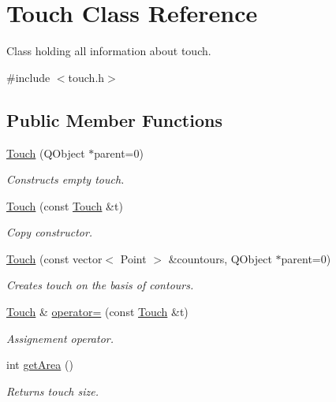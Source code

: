 \hypertarget{class_touch}{
\section{Touch Class Reference}
\label{d1/dff/class_touch}
}


Class holding all information about touch.  




{\ttfamily \#include $<$touch.h$>$}

\subsection*{Public Member Functions}
\begin{DoxyCompactItemize}
\item 
\hyperlink{class_touch_acf278e9c8973d8ded627059841c2fb69}{Touch} (QObject $\ast$parent=0)
\begin{DoxyCompactList}\small\item\em Constructs empty touch. \item\end{DoxyCompactList}\item 
\hyperlink{class_touch_ad5b4890fe1fbf210630a0789ee4c1fad}{Touch} (const \hyperlink{class_touch}{Touch} \&t)
\begin{DoxyCompactList}\small\item\em Copy constructor. \item\end{DoxyCompactList}\item 
\hyperlink{class_touch_a4c7385a87f6e98a8e299b50e42df0761}{Touch} (const vector$<$ Point $>$ \&countours, QObject $\ast$parent=0)
\begin{DoxyCompactList}\small\item\em Creates touch on the basis of contours. \item\end{DoxyCompactList}\item 
\hyperlink{class_touch}{Touch} \& \hyperlink{class_touch_a9b372e45cc4c29abfdb26b8e2a54b3d3}{operator=} (const \hyperlink{class_touch}{Touch} \&t)
\begin{DoxyCompactList}\small\item\em Assignement operator. \item\end{DoxyCompactList}\item 
int \hyperlink{class_touch_a7c2cdb8f571409645582ebe8adce47bd}{getArea} ()
\begin{DoxyCompactList}\small\item\em Returns touch size. \item\end{DoxyCompactList}\item 

\end{DoxyCompactItemize}
